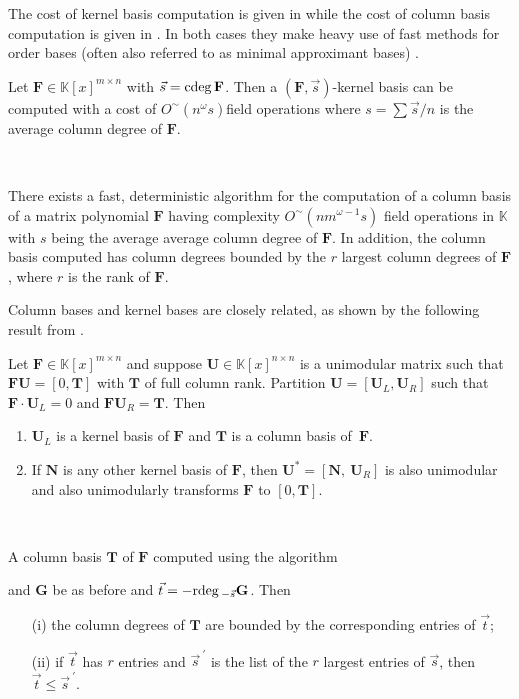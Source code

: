 The cost of kernel basis computation is given in \citet{za2012} while
the cost of column basis computation is given in \citet{za2013}.
In both cases they make heavy use of fast methods for order bases
(often also referred to as minimal approximant bases) \citet{BeLa94,Giorgi2003,ZL2012}.
\begin{thm}
\label{thm:costGeneral} Let $\mathbf{F}\in\mathbb{K}\left[x\right]^{m\times n}$
with $\vec{s}={\rm cdeg}\,\mathbf{F}$. Then a $\left(\mathbf{F},\vec{s}\right)$-kernel
basis can be computed with a cost of $O^{\sim}\left(n^{\omega}s\right)$field
operations where $s=\sum\vec{s}/n$ is the average column degree of
$\mathbf{F}$. 
\end{thm}
~
\begin{thm}
\label{thm:fastcolbasis} There exists a fast, deterministic algorithm
for the computation of a column basis of a matrix polynomial $\mathbf{F}$
having complexity $O^{\sim}\left(nm^{\omega-1}s\right)$ field operations
in $\mathbb{K}$ with $s$ being the average average column degree
of $\mathbf{F}$. In addition, the column basis computed has column
degrees bounded by the $r$ largest column degrees of $\mathbf{F}$,
where $r$ is the rank of $\mathbf{F}$.
\end{thm}
Column bases and kernel bases are closely related, as shown by the
following result from \citet{za2013,zhou:phd2012}.
\begin{lem}
\label{lem:unimodular_kernel_columnBasis} Let $\mathbf{F}\in\mathbb{K}\left[x\right]^{m\times n}$
and suppose $\mathbf{U}\in\mathbb{K}\left[x\right]^{n\times n}$ is
a unimodular matrix such that $\mathbf{F}\mathbf{U}=\left[0,\mathbf{T}\right]$
with $\mathbf{T}$ of full column rank. Partition $\mathbf{U}=\left[\mathbf{U}_{L},\mathbf{U}_{R}\right]$
such that $\mathbf{F}\cdot\mathbf{U}_{L}=0$ and $\mathbf{F}\mathbf{U}_{R}=\mathbf{T}$.
Then 
\begin{enumerate}
\item $\mathbf{U}_{L}$ is a kernel basis of $\mathbf{F}$ and $\mathbf{T}$
is a column basis of~$\mathbf{F}$. 
\item If $\mathbf{N}$ is any other kernel basis of $\mathbf{F}$, then
$\mathbf{U}^{*}=\left[\mathbf{N},~\mathbf{U}_{R}\right]$ is also
unimodular and also unimodularly transforms $\mathbf{F}$ to $\left[0,\mathbf{T}\right]$. 
\end{enumerate}
\end{lem}
~
\begin{lem}
\label{lem:colBasisdegreeBoundByRdegOfRightFactor}A column basis
$\mathbf{T}$ of $\mathbf{F}$ computed using the algorithm 

and $\mathbf{G}$ be as before and $\vec{t}=-{\rm rdeg}\,_{-\vec{s}}\mathbf{G}$.
Then 
\begin{itemize}
\item [(i)] the column degrees of $\mathbf{T}$ are bounded by the corresponding
entries of $\vec{t}$; 
\item [(ii)] if $\vec{t}$ has $r$ entries and $\vec{s}^{~\prime}$ is
the list of the $r$ largest entries of $\vec{s}$, then $\vec{t}\le\vec{s}^{~\prime}$. 
\end{itemize}
\end{lem}


